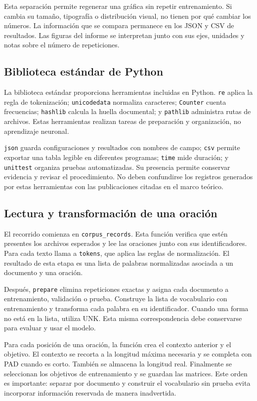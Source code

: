 Esta separación permite regenerar una gráfica sin repetir entrenamiento. Si cambia su tamaño, tipografía o distribución visual, no tienen por qué cambiar los números. La información que se compara permanece en los JSON y CSV de resultados. Las figuras del informe se interpretan junto con sus ejes, unidades y notas sobre el número de repeticiones.

\subsection{Biblioteca estándar de Python}
La biblioteca estándar proporciona herramientas incluidas en Python. \texttt{re} aplica la regla de tokenización; \texttt{unicodedata} normaliza caracteres; \texttt{Counter} cuenta frecuencias; \texttt{hashlib} calcula la huella documental; y \texttt{pathlib} administra rutas de archivos. Estas herramientas realizan tareas de preparación y organización, no aprendizaje neuronal.

\texttt{json} guarda configuraciones y resultados con nombres de campo; \texttt{csv} permite exportar una tabla legible en diferentes programas; \texttt{time} mide duración; y \texttt{unittest} organiza pruebas automatizadas. Su presencia permite conservar evidencia y revisar el procedimiento. No deben confundirse los registros generados por estas herramientas con las publicaciones citadas en el marco teórico.

\subsection{Lectura y transformación de una oración}
El recorrido comienza en \texttt{corpus\_records}. Esta función verifica que estén presentes los archivos esperados y lee las oraciones junto con sus identificadores. Para cada texto llama a \texttt{tokens}, que aplica las reglas de normalización. El resultado de esta etapa es una lista de palabras normalizadas asociada a un documento y una oración.

Después, \texttt{prepare} elimina repeticiones exactas y asigna cada documento a entrenamiento, validación o prueba. Construye la lista de vocabulario con entrenamiento y transforma cada palabra en su identificador. Cuando una forma no está en la lista, utiliza UNK. Esta misma correspondencia debe conservarse para evaluar y usar el modelo.

Para cada posición de una oración, la función crea el contexto anterior y el objetivo. El contexto se recorta a la longitud máxima necesaria y se completa con PAD cuando es corto. También se almacena la longitud real. Finalmente se seleccionan los objetivos de entrenamiento y se guardan las matrices. Este orden es importante: separar por documento y construir el vocabulario sin prueba evita incorporar información reservada de manera inadvertida.

